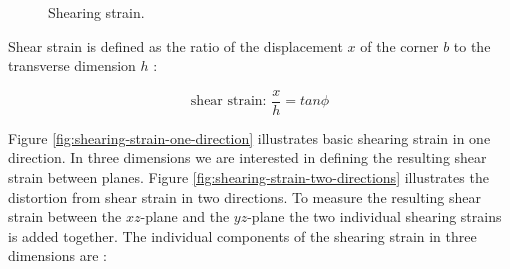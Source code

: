 \begin{figure}
  \centering
  \caption{Shearing strain.}
  \label{fig:shear-strain}
\end{figure}

Shear strain is defined as the ratio of the displacement $x$ of the corner
$b$ to the transverse dimension $h$ :

\begin{equation}
\mbox{shear strain: } \frac{x}{h} = tan \phi
\end{equation}

Figure \vref{fig:shearing-strain-one-direction} illustrates basic
shearing strain in one direction. In three dimensions we are
interested in defining the resulting shear strain between
planes. Figure \vref{fig:shearing-strain-two-directions} illustrates
the distortion from shear strain in two directions. To measure the
resulting shear strain between the $xz$-plane and the $yz$-plane the
two individual shearing strains is added together.
%
The individual components of the shearing strain in three dimensions are
:

